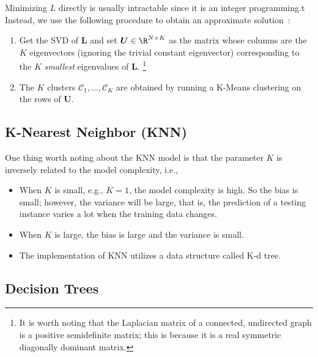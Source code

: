         Minimizing $L$ directly is usually intractable since it is an integer programming.t
        Instead, we use the following procedure to obtain an approximate solution~\cite{shalev2014understanding}:
            \begin{enumerate}
                \item Get the SVD of $\bm{L}$ and set $\bm{U} \in \R^{\ndata \times K}$ as the matrix whose columns are the $K$ eigenvectors (ignoring the trivial constant eigenvector) corresponding to the $K$ \emph{smallest} eigenvalues of $\bm{L}$.
                \footnote{It is worth noting that the Laplacian matrix of a connected, undirected graph is a positive semidefinite matrix; this is because it is a real symmetric diagonally dominant matrix.}
                \item The $K$ clusters $\mathcal{C}_1,\ldots, \mathcal{C}_K$ are obtained by running a K-Means clustering on the rows of $\bm{U}$.
            \end{enumerate}
        
        
\subsection{K-Nearest Neighbor (KNN)}
One thing worth noting about the KNN model is that the parameter $K$ is inversely related to the model complexity, i.e., 
    \begin{itemize}
        \item When $K$ is small, e.g., $K=1$, the model complexity is high. So the bias is small; however, the variance will be large, that is, the prediction of a testing instance varies a lot when the training data changes. 
        \item When $K$ is large, the bias is large and the variance is small.
        \item The implementation of KNN utilizes a data structure called K-d tree. 
    \end{itemize}


\subsection{Decision Trees}
